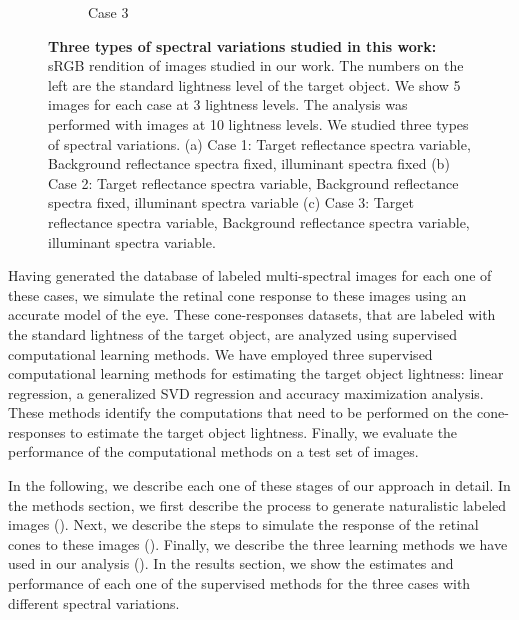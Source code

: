 \documentclass{jov}
\begin{document}
\begin{figure}
\begin{subfigure}[b]{0.33 \textwidth}
        \caption{Case 3}
        \label{fig:allSpectraVarying}
    \end{subfigure}    
    \caption{{\bf Three types of spectral variations studied in this work:} sRGB rendition of images studied in our work. The numbers on the left are the standard lightness level of the target object. We show 5 images for each case at 3 lightness levels. The analysis was performed with images at 10 lightness levels. We studied three types of spectral variations. (a) Case 1: Target reflectance spectra variable, Background reflectance spectra fixed, illuminant spectra fixed (b) Case 2: Target reflectance spectra variable, Background reflectance spectra fixed, illuminant spectra variable (c) Case 3: Target reflectance spectra variable, Background reflectance spectra variable, illuminant spectra variable.}
\label{fig:studiedCases}
\end{figure}

Having generated the database of labeled multi-spectral images for each one of these cases, we simulate the retinal cone response to these images using an accurate model of the eye. These cone-responses datasets, that are labeled with the standard lightness of the target object, are analyzed using supervised computational learning methods. We have employed three supervised computational learning methods for estimating the target object lightness: linear regression, a generalized SVD regression and accuracy maximization analysis. These methods identify the computations that need to be performed on the cone-responses to estimate the target object lightness. Finally, we evaluate the performance of the computational methods on a test set of images.

In the following, we describe each one of these stages of our approach in detail. In the methods section, we first describe the process to generate naturalistic labeled images (). Next, we describe the steps to simulate the response of the retinal cones to these images (). Finally, we describe the three learning methods we have used in our analysis (). In the results section, we show the estimates and performance of each one of the supervised methods for the three cases with different spectral variations. 
\end{document}
